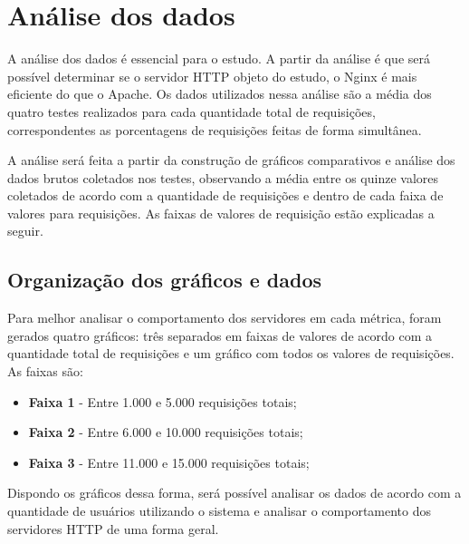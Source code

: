 \chapter{Análise dos dados}\label{cap:analise-dos-dados}

A análise dos dados é essencial para o estudo. A partir da análise é que 
será possível determinar se o servidor HTTP objeto do estudo, o Nginx é mais 
eficiente do que o Apache. Os dados utilizados nessa análise são a média dos 
quatro testes realizados para cada quantidade total de requisições, 
correspondentes as porcentagens de requisições feitas de forma simultânea.

A análise será feita a partir da construção de gráficos comparativos e análise 
dos dados brutos coletados nos testes, observando a média 
entre os quinze valores coletados de acordo com a quantidade de requisições e 
dentro de cada faixa de valores para requisições. As faixas de valores de 
requisição estão explicadas a seguir.

\section{Organização dos gráficos e dados}

Para melhor analisar o comportamento dos servidores em cada métrica, foram 
gerados quatro gráficos: três separados em faixas de valores de acordo com a 
quantidade total de requisições e um gráfico com todos os valores 
de requisições. As faixas são:

\begin{itemize}
	\item \textbf{Faixa 1} - Entre 1.000 e 5.000 requisições totais;
	\item \textbf{Faixa 2} - Entre 6.000 e 10.000 requisições totais;
	\item \textbf{Faixa 3} - Entre 11.000 e 15.000 requisições totais;
\end{itemize}

Dispondo os gráficos dessa forma, será possível analisar os dados de acordo com 
a quantidade de usuários utilizando o sistema e analisar o comportamento dos 
servidores HTTP de uma forma geral.


%
